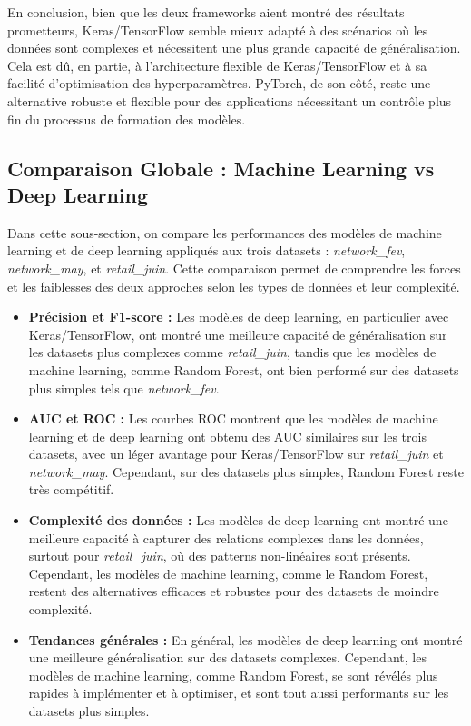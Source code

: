 En conclusion, bien que les deux frameworks aient montré des résultats prometteurs, Keras/TensorFlow semble mieux adapté à des scénarios où les données sont complexes et nécessitent une plus grande capacité de généralisation. Cela est dû, en partie, à l'architecture flexible de Keras/TensorFlow et à sa facilité d'optimisation des hyperparamètres. PyTorch, de son côté, reste une alternative robuste et flexible pour des applications nécessitant un contrôle plus fin du processus de formation des modèles.

\subsection{Comparaison Globale : Machine Learning vs Deep Learning}

Dans cette sous-section, on compare les performances des modèles de machine learning et de deep learning appliqués aux trois datasets : \textit{network\_fev}, \textit{network\_may}, et \textit{retail\_juin}. Cette comparaison permet de comprendre les forces et les faiblesses des deux approches selon les types de données et leur complexité.

\begin{itemize}
    \item \textbf{Précision et F1-score :} Les modèles de deep learning, en particulier avec Keras/TensorFlow, ont montré une meilleure capacité de généralisation sur les datasets plus complexes comme \textit{retail\_juin}, tandis que les modèles de machine learning, comme Random Forest, ont bien performé sur des datasets plus simples tels que \textit{network\_fev}.
    
    \item \textbf{AUC et ROC :} Les courbes ROC montrent que les modèles de machine learning et de deep learning ont obtenu des AUC similaires sur les trois datasets, avec un léger avantage pour Keras/TensorFlow sur \textit{retail\_juin} et \textit{network\_may}. Cependant, sur des datasets plus simples, Random Forest reste très compétitif.

    \item \textbf{Complexité des données :} Les modèles de deep learning ont montré une meilleure capacité à capturer des relations complexes dans les données, surtout pour \textit{retail\_juin}, où des patterns non-linéaires sont présents. Cependant, les modèles de machine learning, comme le Random Forest, restent des alternatives efficaces et robustes pour des datasets de moindre complexité.

    \item \textbf{Tendances générales :} En général, les modèles de deep learning ont montré une meilleure généralisation sur des datasets complexes. Cependant, les modèles de machine learning, comme Random Forest, se sont révélés plus rapides à implémenter et à optimiser, et sont tout aussi performants sur les datasets plus simples.
\end{itemize}


